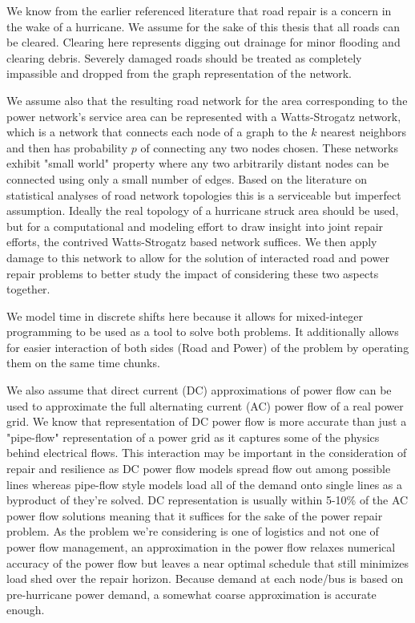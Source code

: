\documentclass{article}
\begin{document}
	We know from the earlier referenced literature that road repair is a concern in the wake of a hurricane. We assume for the sake of this thesis that all roads can be cleared. Clearing here represents digging out drainage for minor flooding and clearing debris. Severely damaged roads should be treated as completely impassible and dropped from the graph representation of the network.
	
	We assume also that the resulting road network for the area corresponding to the power network's service area can be represented with a Watts-Strogatz network, which is a network that connects each node of a graph to the $k$ nearest neighbors and then has probability $p$ of connecting any two nodes chosen. These networks exhibit "small world" property where any two arbitrarily distant nodes can be connected using only a small number of edges. Based on the literature on statistical analyses of road network topologies \cite{LammerEA2006} \cite{ChanEA2011} this is a serviceable but imperfect assumption. Ideally the real topology of a hurricane struck area should be used, but for a computational and modeling effort to draw insight into joint repair efforts, the contrived Watts-Strogatz based network suffices. We then apply damage to this network to allow for the solution of interacted road and power repair problems to better study the impact of considering these two aspects together.
		
	We model time in discrete shifts here because it allows for mixed-integer programming to be used as a tool to solve both problems. It additionally allows for easier interaction of both sides (Road and Power) of the problem by operating them on the same time chunks.
	
	We also assume that direct current (DC) approximations of power flow can be used to approximate the full alternating current (AC) power flow of a real power grid. We know that representation of DC power flow is more accurate than just a "pipe-flow" representation of a power grid as it captures some of the physics behind electrical flows. This interaction may be important in the consideration of repair and resilience as DC power flow models spread flow out among possible lines whereas pipe-flow style models load all of the demand onto single lines as a byproduct of they're solved. DC representation is usually within 5-10\% of the AC power flow solutions \cite{Frank2016} \cite{StottEA2009} meaning that it suffices for the sake of the power repair problem. As the problem we're considering is one of logistics and not one of power flow management, an approximation in the power flow relaxes numerical accuracy of the power flow but leaves a near optimal schedule that still minimizes load shed over the repair horizon. Because demand at each node/bus is based on pre-hurricane power demand, a somewhat coarse approximation is accurate enough.  
	
\end{document}
